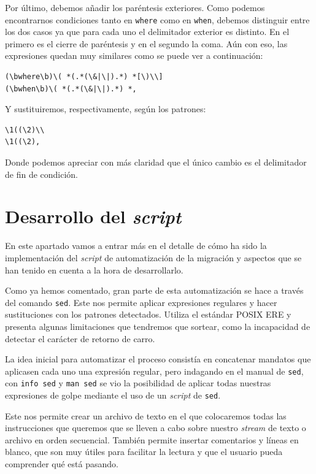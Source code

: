 \documentclass[12pt,twoside,titlepage]{report}
\begin{document}
Por último, debemos añadir los paréntesis exteriores. Como podemos encontrarnos condiciones tanto en \texttt{where} como en \texttt{when}, debemos distinguir entre los dos casos ya que para cada uno el delimitador exterior es distinto. En el primero es el cierre de paréntesis y en el segundo la coma. Aún con eso, las expresiones quedan muy similares como se puede ver a continuación:

\begin{lstlisting}
(\bwhere\b)\( *(.*(\&|\|).*) *[\)\\]
(\bwhen\b)\( *(.*(\&|\|).*) *,
\end{lstlisting}

Y sustituiremos, respectivamente, según los patrones:

\begin{lstlisting}
\1((\2)\\
\1((\2),
\end{lstlisting}

Donde podemos apreciar con más claridad que el único cambio es el delimitador de fin de condición.

\section{Desarrollo del \textit{script}}
\label{apendicescript}

En este apartado vamos a entrar más en el detalle de cómo ha sido la implementación del \textit{script} de automatización de la migración y aspectos que se han tenido en cuenta a la hora de desarrollarlo.

Como ya hemos comentado, gran parte de esta automatización se hace a través del comando \texttt{sed}. Este nos permite aplicar expresiones regulares y hacer sustituciones con los patrones detectados. Utiliza el estándar POSIX ERE y presenta algunas limitaciones que tendremos que sortear, como la incapacidad de detectar el carácter de retorno de carro.

La idea inicial para automatizar el proceso consistía en concatenar mandatos que aplicasen cada uno una expresión regular, pero indagando en el manual de \texttt{sed}, con \texttt{info sed} y \texttt{man sed} se vio la posibilidad de aplicar todas nuestras expresiones de golpe mediante el uso de un \textit{script} de \texttt{sed}.

Este nos permite crear un archivo de texto en el que colocaremos todas las instrucciones que queremos que se lleven a cabo sobre nuestro \textit{stream} de texto o archivo en orden secuencial. También permite insertar comentarios y líneas en blanco, que son muy útiles para facilitar la lectura y que el usuario pueda comprender qué está pasando.
\end{document}

